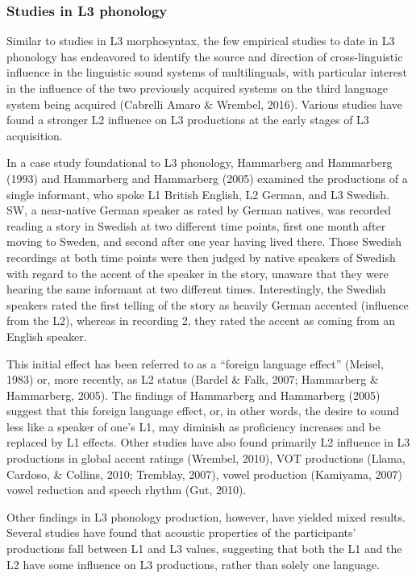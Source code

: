 \documentclass[
  english,
  man]{apa6}
\begin{document}
\hypertarget{studies-in-l3-phonology}{%
\subsubsection{Studies in L3 phonology}\label{studies-in-l3-phonology}}

Similar to studies in L3 morphosyntax, the few empirical studies to date in L3 phonology has endeavored to identify the source and direction of cross-linguistic influence in the linguistic sound systems of multilinguals, with particular interest in the influence of the two previously acquired systems on the third language system being acquired (Cabrelli Amaro \& Wrembel, 2016).
Various studies have found a stronger L2 influence on L3 productions at the early stages of L3 acquisition.

In a case study foundational to L3 phonology, Hammarberg and Hammarberg (1993) and Hammarberg and Hammarberg (2005) examined the productions of a single informant, who spoke L1 British English, L2 German, and L3 Swedish.
SW, a near-native German speaker as rated by German natives, was recorded reading a story in Swedish at two different time points, first one month after moving to Sweden, and second after one year having lived there.
Those Swedish recordings at both time points were then judged by native speakers of Swedish with regard to the accent of the speaker in the story, unaware that they were hearing the same informant at two different times.
Interestingly, the Swedish speakers rated the first telling of the story as heavily German accented (influence from the L2), whereas in recording 2, they rated the accent as coming from an English speaker.

This initial effect has been referred to as a \enquote{foreign language effect} (Meisel, 1983) or, more recently, as L2 status (Bardel \& Falk, 2007; Hammarberg \& Hammarberg, 2005).
The findings of Hammarberg and Hammarberg (2005) suggest that this foreign language effect, or, in other words, the desire to sound less like a speaker of one's L1, may diminish as proficiency increases and be replaced by L1 effects.
Other studies have also found primarily L2 influence in L3 productions in global accent ratings (Wrembel, 2010), VOT productions (Llama, Cardoso, \& Collins, 2010; Tremblay, 2007), vowel production (Kamiyama, 2007) vowel reduction and speech rhythm (Gut, 2010).

Other findings in L3 phonology production, however, have yielded mixed results.
Several studies have found that acoustic properties of the participants' productions fall between L1 and L3 values, suggesting that both the L1 and the L2 have some influence on L3 productions, rather than solely one language.
\end{document}
